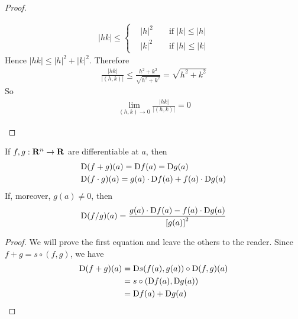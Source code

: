 \begin{proof}
\begin{enumerate}[label={\upshape(\arabic*)}]
\begin{align*}
                |hk| \le \left\{\begin{aligned}
                    & |h|^2 && \text{ if } |k| \le |h| \\
                    & |k|^2 && \text{ if } |h| \le |k|
                \end{aligned}\right.
            \end{align*}
            Hence $|hk|\le |h|^2 + |k|^2$. Therefore 
            \begin{align*}
                \frac{|hk|}{|(h, k)|} \le \frac{h^2 + k^2}{\sqrt{h^2 + k^2}} = \sqrt{h^2 + k^2}
            \end{align*}
            So 
            \begin{align*}
                \lim_{(h, k)\to 0}{\frac{|hk|}{|(h, k)|}} = 0
            \end{align*}
    \end{enumerate}
\end{proof}


\begin{corollary}
    If $f,g:\mathbf{R}^n\to \mathbf{R}$ are differentiable at $a$, then 
    \begin{align*}
        & \mathrm{D}(f+g)(a) = \mathrm{D}f(a) = \mathrm{D}g(a) \\
        & \mathrm{D}(f\cdot g)(a) = g(a)\cdot \mathrm{D}f(a) + f(a)\cdot \mathrm{D}g(a)
    \end{align*}
    If, moreover, $g(a)\neq 0$, then 
    \begin{align*}
        \mathrm{D}(f/g)(a) = \frac{g(a)\cdot \mathrm{D}f(a) - f(a)\cdot \mathrm{D}g(a)}{\left[g(a)\right]^2}
    \end{align*} 
\end{corollary}

\begin{proof}
    We will prove the first equation and leave the others
    to the reader. Since $f+g = s\circ (f, g)$, we have 
    \begin{align*}
        \mathrm{D}(f+g)(a)
        & = \mathrm{D}s(f(a),g(a))\circ \mathrm{D}(f,g)(a)  \\
        & = s\circ(\mathrm{D}f(a),\mathrm{D}g(a)) \\
        & = \mathrm{D}f(a)+\mathrm{D}g(a)
    \end{align*}
\end{proof}

